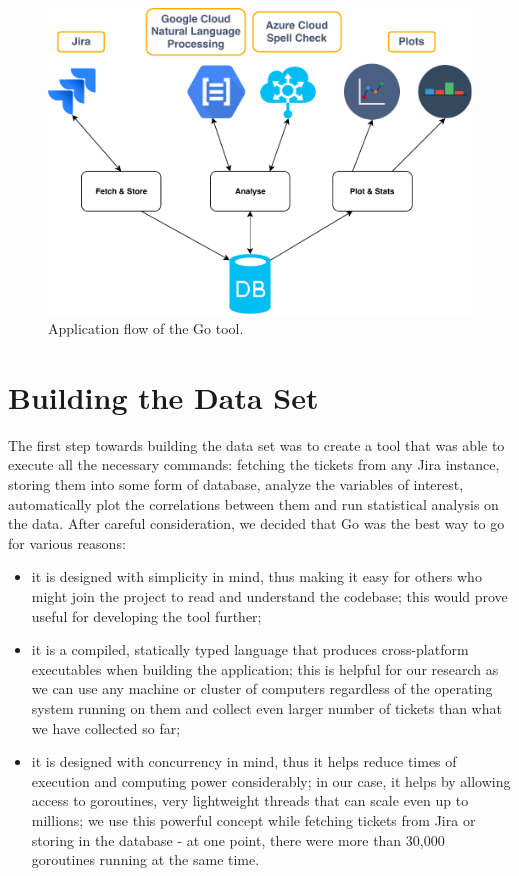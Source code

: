 \documentclass{mpaper}
\begin{document}
\begin{figure}
\begin{center}
\includegraphics[scale=0.80]{images/flow.pdf}
\end{center}
\caption{\label{fig-eg}Application flow of the Go tool.}
\end{figure}

\section{Building the Data Set}\label{building}
The first step towards building the data set was to create a tool that was able to execute all the necessary commands:
fetching the tickets from any Jira instance, storing them into some form of database, analyze the variables of interest, 
automatically plot the correlations between them and run statistical analysis on the data. After careful consideration, 
we decided that Go was the best way to go for various reasons:
  \begin{itemize}
    \item it is designed with simplicity in mind, thus making it easy for others who might join the project to read 
    and understand the codebase; this would prove useful for developing the tool further;
    \item it is a compiled, statically typed language that produces cross-platform executables when building the application;
    this is helpful for our research as we can use any machine or cluster of computers regardless of the operating system 
    running on them and collect even larger number of tickets than what we have collected so far;
    \item it is designed with concurrency in mind, thus it helps reduce times of execution and computing power considerably;
    in our case, it helps by allowing access to goroutines, very lightweight threads that can scale even up to 
    millions; we use this powerful concept while fetching tickets from Jira or storing in the database - at one point, there were 
    more than 30,000 goroutines running at the same time.
  \end{itemize}
\end{document}

